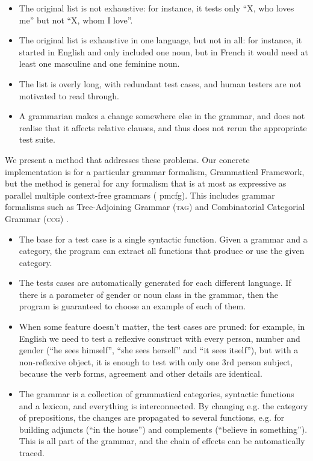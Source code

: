 \documentclass[11pt]{article}
\def\ccg{\textsc{ccg}}
\def\tag{\textsc{tag}}
\begin{document}

\begin{itemize}
\item The original list is not exhaustive: for instance, it tests only
``X, who loves me'' but not ``X, whom I love''. 
\item The original list is exhaustive in one language, but not in all:
for instance, it started in English and only included one noun, but in
French it would need at least one masculine and one feminine noun. 
\item The list is overly long, with redundant test cases, and human
testers are not motivated to read through. 
\item A grammarian makes a change somewhere else in the grammar, and
does not realise that it affects relative clauses, and thus does not
rerun the appropriate test suite. 
\end{itemize}

We present a method that addresses these problems. Our concrete
implementation is for a particular grammar formalism, Grammatical
Framework, but the method is general for any formalism that is at most
as expressive as parallel multiple context-free grammars ({\sc
  pmcfg}). This includes grammar formalisms such as Tree-Adjoining
Grammar (\tag) \cite{joshi1975tag} and Combinatorial Categorial
Grammar (\ccg) \cite{steedman1988ccg}.

\begin{itemize}
\item The base for a test case is a single syntactic function. Given a
  grammar and a category, the program can extract all functions that
  produce or use the given category.
\item The tests cases are automatically generated for each different
  language. If there is a parameter of gender or noun class in the
  grammar, then the program is guaranteed to choose an example of each
  of them.
\item When some feature doesn't matter, the test cases are pruned: for
  example, in English we need to test a reflexive construct with every
  person, number and gender (``he sees himself'', ``she sees herself''
  and ``it sees itself''), but with a non-reflexive object, it is
  enough to test with only one 3rd person subject, because the verb
  forms, agreement and other details are identical.
\item The grammar is a collection of grammatical categories, syntactic
  functions and a lexicon, and everything is interconnected. By
  changing e.g. the category of prepositions, the changes are
  propagated to several functions, e.g. for building adjuncts (``in
  the house'') and complements (``believe in something''). This is
  all part of the grammar, and the chain of effects can be
  automatically traced. 
\end{itemize}
\end{document}
